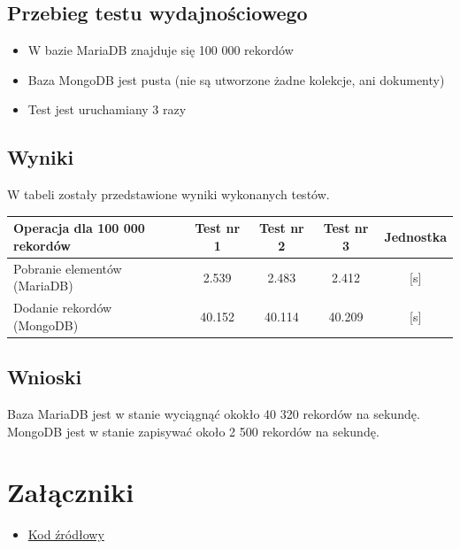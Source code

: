 \documentclass[12pt,oneside,a4paper]{book}
\begin{document}
    \section*{Przebieg testu wydajnościowego}

    \begin{itemize}
        \item W bazie MariaDB znajduje się 100 000 rekordów
        \item Baza MongoDB jest pusta (nie są utworzone żadne kolekcje, ani dokumenty)
        \item Test jest uruchamiany 3 razy
    \end{itemize}

    \section*{Wyniki}

    W tabeli zostały przedstawione wyniki wykonanych testów.

    \vspace{0.5cm}

    \noindent
    \begin{tabular}{ l | c | c | c | c }
        Operacja dla 100 000 rekordów & Test nr 1 & Test nr 2 & Test nr 3 & Jednostka \\
        \hline
        Pobranie elementów (MariaDB) & 2.539 & 2.483 & 2.412 & [s] \\
        Dodanie rekordów (MongoDB) & 40.152 & 40.114 & 40.209 & [s] \\
    \end{tabular}

    \section*{Wnioski}
    Baza MariaDB jest w stanie wyciągnąć okokło 40 320 rekordów na sekundę.
    MongoDB jest w stanie zapisywać około
    2 500 rekordów na sekundę.

    \chapter*{Załączniki}
    \begin{itemize}
        \item \href{https://github.com/addun/nosql_2020_niestacjonarne/tree/master/lab1}{Kod źródłowy}
    \end{itemize}
\end{document}
